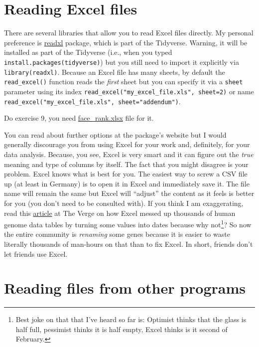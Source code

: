 \documentclass[
]{book}
\begin{document}
\hypertarget{readxl}{%
\section{Reading Excel files}\label{readxl}}

There are several libraries that allow you to read Excel files directly. My personal preference is \href{https://readxl.tidyverse.org/}{readxl} package, which is part of the Tidyverse. Warning, it will be installed as part of the Tidyverse (i.e., when you typed \texttt{install.packages(tidyverse)}) but you still need to import it explicitly via \texttt{library(readxl)}. Because an Excel file has many sheets, by default the \texttt{read\_excel()} function reads the \emph{first} sheet but you can specify it via a \texttt{sheet} parameter using its index \texttt{read\_excel("my\_excel\_file.xls",\ sheet=2)} or name \texttt{read\_excel("my\_excel\_file.xls",\ sheet="addendum")}.

Do exercise 9, you need \href{data/face_rank.xlsx}{face\_rank.xlsx} file for it.

You can read about further options at the package's website but I would generally discourage you from using Excel for your work and, definitely, for your data analysis. Because, you see, Excel is very smart and it can figure out the \emph{true} meaning and type of columns by itself. The fact that you might disagree is your problem. Excel knows what is best for you. The easiest way to screw a CSV file up (at least in Germany) is to open it in Excel and immediately save it. The file name will remain the same but Excel will ``adjust'' the content as it feels is better for you (you don't need to be consulted with). If you think I am exaggerating, read this \href{https://www.theverge.com/2020/8/6/21355674/human-genes-rename-microsoft-excel-misreading-dates}{article} at The Verge on how Excel messed up thousands of human genome data tables by turning some values into dates because why not\footnote{Best joke on that that I've heard so far is: Optimist thinks that the glass is half full, pessimist thinks it is half empty, Excel thinks is it second of February.}? So now the entire community is \emph{renaming} some genes because it is easier to waste literally thousands of man-hours on that than to fix Excel. In short, friends don't let friends use Excel.

\hypertarget{reading-files-from-other-programs}{%
\section{Reading files from other programs}\label{reading-files-from-other-programs}}
\end{document}
